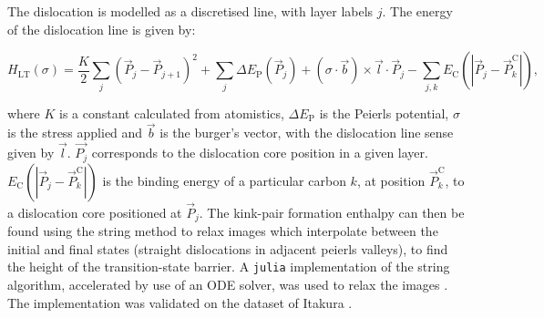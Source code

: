 \documentclass[a4paper,12pt,oneside,print,numbered,index,PageStyleIII]{PhDThesisPSnPDF}
\begin{document}
The dislocation is modelled as a discretised line, with layer labels \(j\). The energy of the
dislocation line is given by:

\[ H_{\text{LT}}(\sigma) = \frac{K}{2} \sum_j (\vec{P}_j - \vec{P}_{j+1} )^2  + \sum_j \Delta E_{\text{P}}  (\vec{P}_j) +
    (\sigma \cdot \vec{b}) \times \vec{l} \cdot \vec{P}_j  - \sum_{j,k} E_{\text{C}} (|\vec{P}_j-\vec{P}_k^{\text{C}}|), \label{eq:line-tension}\]

where \(K\) is a constant calculated from atomistics, \(\Delta E_{\text{P}}\) is the
Peierls potential, \(\sigma\) is the stress applied and \(\vec{b}\) is the burger's vector,
with the dislocation line sense given by \(\vec{l}\). \(\vec{P_{j}}\) corresponds to the
dislocation core position in a given layer. \(E_{\text{C}}
    (|\vec{P}_j-\vec{P}_k^{\text{C}}|)\) is the binding energy of a particular carbon \(k\),
at position \(\vec{P}_k^{\text{C}}\), to a dislocation core positioned at
\(\vec{P}_j\). The kink-pair formation enthalpy can then be found using the string method
to relax images which interpolate between the initial and final states (straight
dislocations in adjacent peierls valleys), to find the height of the transition-state
barrier. A \texttt{julia} implementation of the string algorithm, accelerated by use of an ODE
solver, was used to relax the images \cite{Makri2019}. The implementation was validated
on the dataset of Itakura \cite{Itakura2012}.
\end{document}
